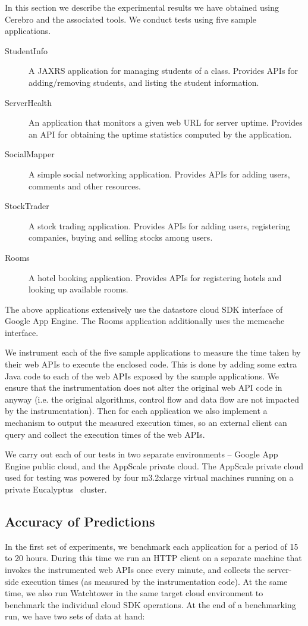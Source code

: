 In this section we describe the experimental results we have obtained using Cerebro and the associated tools. We conduct
tests using five sample applications. 

\begin{description}
\item[StudentInfo] A JAXRS application for managing students of a class. Provides APIs for
adding/removing students, and listing the student information.
\item[ServerHealth] An application that monitors a given web URL for server uptime. Provides an
API for obtaining the uptime statistics computed by the application.
\item[SocialMapper] A simple social networking application. Provides APIs for adding users,
comments and other resources.
\item[StockTrader] A stock trading application. Provides APIs for adding users, registering
companies, buying and selling stocks among users.
\item[Rooms] A hotel booking application. Provides APIs for registering hotels and looking up
available rooms.
\end{description}

The above applications extensively use the datastore cloud SDK interface of Google App Engine. The Rooms application
additionally uses the memcache interface.

We instrument each of the five sample applications to measure the time taken by their web APIs to execute the
enclosed code. This is done by adding some extra Java code to each of the web APIs exposed by the sample applications.
We ensure that the instrumentation does not alter the original web API code in anyway (i.e. the original algorithms, control flow
and data flow are not impacted by the instrumentation). Then for each application we also
implement a mechanism to output the measured execution times, so an external client can query and collect the execution
times of the web APIs.

We carry out each of our tests in two separate environments -- Google App Engine public cloud, and
the AppScale private cloud. The AppScale private cloud used for testing was powered by four m3.2xlarge virtual machines 
running on a private Eucalyptus~\cite{eucalyptus09} cluster.

\subsection{Accuracy of Predictions}
In the first set of experiments, we benchmark each application for a period of 15 to 20 hours.
During this time we run an HTTP client on a separate machine that invokes the instrumented web APIs once every minute, 
and collects the server-side execution times (as measured by the instrumentation code).
At the same time, we also run Watchtower in the same target cloud environment to
benchmark the individual cloud SDK operations. 
At the end of a benchmarking run, we have two sets of data at hand:

